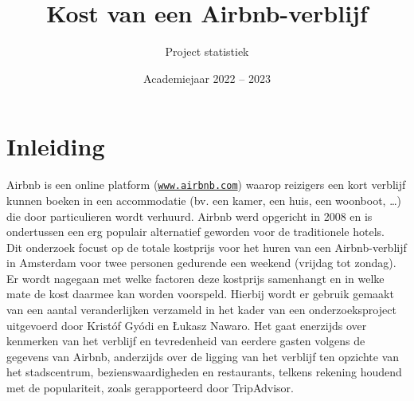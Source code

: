 \documentclass[a4paper]{kulakarticle}
\title{Kost van een Airbnb-verblijf}
\author{Project statistiek}
\date{Academiejaar 2022 -- 2023}
\begin{document}
	\maketitle
	\section*{Inleiding}
	Airbnb is een online platform (\href{https://www.airbnb.com}{\texttt{www.airbnb.com}}) waarop reizigers een kort verblijf kunnen boeken in een accommodatie (bv. een kamer, een huis, een woonboot, …) die door particulieren wordt verhuurd. Airbnb werd opgericht in 2008 en is ondertussen een erg populair alternatief geworden voor de traditionele hotels. \\
	
	Dit onderzoek focust op de totale kostprijs voor het huren van een Airbnb-verblijf in Amsterdam voor twee personen gedurende een weekend (vrijdag tot zondag). Er wordt nagegaan met welke factoren deze kostprijs samenhangt en in welke mate de kost daarmee kan worden voorspeld. Hierbij wordt er gebruik gemaakt van een aantal veranderlijken verzameld in het kader van een onderzoeksproject uitgevoerd door Kristóf Gyódi en Łukasz Nawaro. Het gaat enerzijds over kenmerken van het verblijf en tevredenheid van eerdere gasten volgens de gegevens van Airbnb, anderzijds over de ligging van het verblijf ten opzichte van het stadscentrum, bezienswaardigheden en restaurants, telkens rekening houdend met de populariteit, zoals gerapporteerd door TripAdvisor.\\
	
\end{document}
